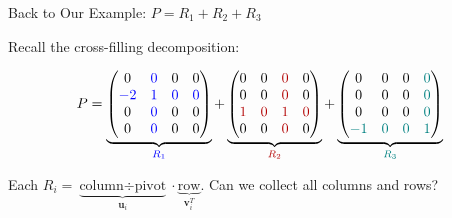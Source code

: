 \documentclass[10pt]{beamer}
\theoremstyle{definition}
\newcommand{\bl}[1]{{\color{blue}#1}}                 %
\newcommand{\rd}[1]{{\color{red!70!black}#1}}         %
\newcommand{\tl}[1]{{\color{teal}#1}}                 %
\begin{document}
%
\begin{frame}{Back to Our Example: $P = R_1 + R_2 + R_3$}

Recall the cross-filling decomposition:

$$P = \underbrace{\begin{pmatrix} 0 & \bl{0} & 0 & 0 \\ \bl{-2} & \bl{1} & \bl{0} & \bl{0} \\ 0 & \bl{0} & 0 & 0 \\ 0 & \bl{0} & 0 & 0 \end{pmatrix}}_{\bl{R_1}} + \underbrace{\begin{pmatrix} 0 & 0 & \rd{0} & 0 \\ 0 & 0 & \rd{0} & 0 \\ \rd{1} & \rd{0} & \rd{1} & \rd{0} \\ 0 & 0 & \rd{0} & 0 \end{pmatrix}}_{\rd{R_2}} + \underbrace{\begin{pmatrix} 0 & 0 & 0 & \tl{0} \\ 0 & 0 & 0 & \tl{0} \\ 0 & 0 & 0 & \tl{0} \\ \tl{-1} & \tl{0} & \tl{0} & \tl{1} \end{pmatrix}}_{\tl{R_3}}$$

\vspace{0.3em}

Each $R_i = \underbrace{\text{column} \div \text{pivot}}_{\mathbf{u}_i} \cdot \underbrace{\text{row}}_{\mathbf{v}_i^T}$. \quad Can we collect all columns and rows?

\end{frame}
\end{document}
